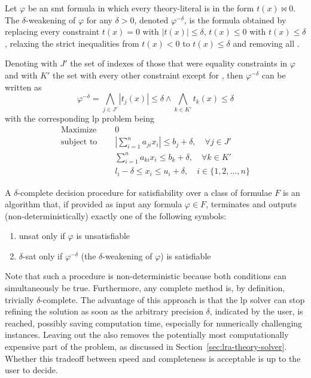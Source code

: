 \documentclass[runningheads]{llncs}
\begin{document}
\begin{definition}
    Let $\varphi$ be an \gls{smt} formula in which every theory-literal is in the form $t(x) \bowtie 0$.
    The $\delta$-weakening of $\varphi$ for any $\delta > 0$, denoted $\varphi^{-\delta}$, is the formula obtained by replacing every constraint $t(x) = 0$ with $|t(x)| \le \delta$, $t(x) \le 0$ with $t(x) \le \delta$, relaxing the strict inequalities from $t(x) < 0$ to $t(x) \le \delta$ and removing all \nqcs.
\end{definition}
Denoting with $J'$ the set of indexes of those that were equality constraints in $\varphi$ and with $K'$ the set with every other constraint except for \nqcs, then $\varphi^{-\delta}$ can be written as
\begin{equation*}
    \varphi^{-\delta} = \bigwedge_{j \in J'} |t_j(x)| \le \delta \wedge \bigwedge_{k \in K'} t_k(x) \le \delta
\end{equation*}
with the corresponding \gls{lp} problem being
\begin{equation}
    \label{eq:delta-lp}
    \begin{split}
        \text{Maximize }   \quad & 0                                                                                \\
        \text{subject to } \quad & \left|\sum_{i=1}^{n} a_{ji}x_{i}\right| \le b_j + \delta, \quad \forall j \in J' \\
        \quad                    & \sum_{i=1}^{n} a_{ki}x_{i} \le b_k + \delta, \quad \forall k \in K'              \\
        \quad                    & l_i - \delta \le x_i \le u_i + \delta,  \quad i \in \{1, 2, \ldots, n\}
    \end{split}
\end{equation}
\begin{definition}
    A $\delta$-complete decision procedure for satisfiability over a class of formulae $F$ is an algorithm that, if provided as input any formula $\varphi \in F$, terminates and outputs (non-deterministically) exactly one of the following symbols:
    \begin{enumerate}
        \item unsat only if $\varphi$ is unsatisfiable
        \item $\delta$-sat only if $\varphi^{-\delta}$ (the $\delta$-weakening of $\varphi$) is satisfiable
    \end{enumerate}
\end{definition}
Note that such a procedure is non-deterministic because both conditions can simultaneously be true.
Furthermore, any complete method is, by definition, trivially $\delta$-complete.
The advantage of this approach is that the \gls{lp} solver can stop refining the solution as soon as the arbitrary precision $\delta$, indicated by the user, is reached, possibly saving computation time, especially for numerically challenging instances.
Leaving out the \nqcs also removes the potentially most computationally expensive part of the problem, as discussed in Section~\ref{sec:lra-theory-solver}.
Whether this tradeoff between speed and completeness is acceptable is up to the user to decide.
\end{document}
